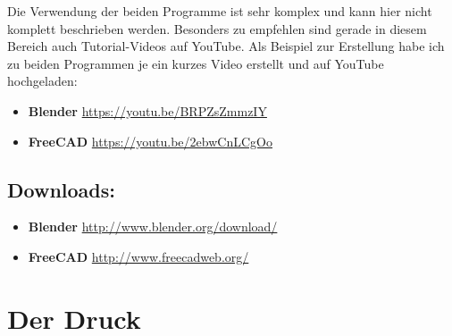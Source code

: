 \documentclass[11pt,a4paper]{scrartcl}
\begin{document}
Die Verwendung der beiden Programme ist sehr komplex und kann hier nicht komplett beschrieben werden. Besonders zu empfehlen sind gerade in diesem Bereich auch Tutorial-Videos auf YouTube. Als Beispiel zur Erstellung habe ich zu beiden Programmen je ein kurzes Video erstellt und auf YouTube hochgeladen:
\begin{itemize}
  \item \textbf{Blender} \url{https://youtu.be/BRPZsZmmzIY}
  \item \textbf{FreeCAD} \url{https://youtu.be/2ebwCnLCgOo}
\end{itemize}

\subsection*{Downloads:}
\begin{itemize}
  \item \textbf{Blender} \url{http://www.blender.org/download/}
  \item \textbf{FreeCAD} \url{http://www.freecadweb.org/}
\end{itemize}
\pagebreak
\section{Der Druck}
\end{document}
